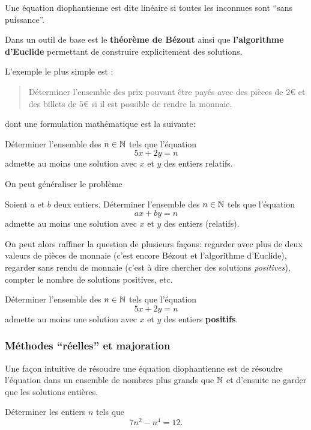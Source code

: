 Une équation diophantienne est dite linéaire si toutes les inconnues
sont ``sans puissance''.

Dans un outil de base est le \textbf{théorème de Bézout} ainsi que
\textbf{l'algorithme d'Euclide} permettant de construire explicitement
des solutions.

L'exemple le plus simple est :

\begin{quote}
Déterminer l'ensemble des prix pouvant être payés avec des pièces de $2$€ et des billets de $5$€ si il est possible de rendre la monnaie.
\end{quote}

dont une formulation mathématique est la suivante:

\begin{exo}
  Déterminer l'ensemble des $n \in \mathbb N$ tels que l'équation
  $$5x+2y=n$$
  admette au moins une solution avec $x$ et $y$ des entiers relatifs.
\end{exo}

On peut généraliser le problème

\begin{exo}
  Soient $a$ et $b$ deux entiers.
  Déterminer l'ensemble des $n \in \mathbb N$ tels que l'équation
  $$ax+by=n$$
  admette au moins une solution avec $x$ et $y$ des entiers (relatifs).
\end{exo}


On peut alors raffiner la question de plusieurs façons: regarder avec plus de deux valeurs de pièces de monnaie (c'est encore Bézout et l'algorithme d'Euclide), regarder sans rendu de monnaie (c'est à dire chercher des solutions \emph{positives}), compter le nombre de solutions positives, etc.


\begin{exo}
  Déterminer l'ensemble des $n \in \mathbb N$ tels que l'équation
  $$5x+2y=n$$
  admette au moins une solution avec $x$ et $y$ des entiers \textbf{positifs}.
\end{exo}

\subsubsection{Méthodes ``réelles'' et majoration}

Une façon intuitive de résoudre une équation diophantienne est de résoudre l'équation dans un ensemble de nombres plus grands que $\mathbb N$ et d'ensuite ne garder que les solutions entières.

\begin{exo}
  Déterminer les entiers $n$ tels que
  $$7 n^2 - n^4 = 12. $$
\end{exo}


